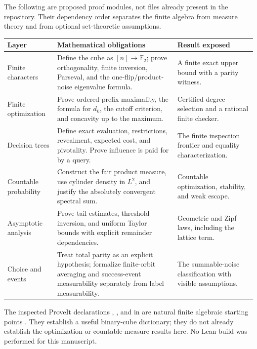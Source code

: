 \documentclass[11pt,a4paper]{article}
\theoremstyle{definition}
\theoremstyle{remark}
\newcommand{\Ftwo}{\mathbb F_2}
\begin{document}
The following are proposed proof modules, not files already present in
the repository. Their dependency order separates the finite algebra from
measure theory and from optional set-theoretic assumptions.

\begin{longtable}{@{}L{.22\textwidth}L{.47\textwidth}L{.22\textwidth}@{}}
\toprule
Layer & Mathematical obligations & Result exposed\\
\midrule
\endhead
Finite characters&
Define the cube as \([n]\to\Ftwo\); prove orthogonality, finite inversion,
Parseval, and the one-flip/product-noise eigenvalue formula.&
A finite exact upper bound with a parity witness.\\
Finite optimization&
Prove ordered-prefix maximality, the formula for \(d_k\), the cutoff
criterion, and concavity up to the maximum.&
Certified degree selection and a rational finite checker.\\
Decision trees&
Define exact evaluation, restrictions, revealment, expected cost,
and pivotality. Prove influence is paid for by a query.&
The finite inspection frontier and equality characterization.\\
Countable probability&
Construct the fair product measure, use cylinder density in \(L^2\),
and justify the absolutely convergent spectral sum.&
Countable optimization, stability, and weak escape.\\
Asymptotic analysis&
Prove tail estimates, threshold inversion, and uniform Taylor bounds
with explicit remainder dependencies.&
Geometric and Zipf laws, including the lattice term.\\
Choice and events&
Treat total parity as an explicit hypothesis; formalize finite-orbit
averaging and success-event measurability separately from label
measurability.&
The summable-noise classification with visible assumptions.\\
\bottomrule
\end{longtable}

The inspected ProveIt declarations
,
, and
in  are natural finite algebraic
starting points \cite{repocube}. They establish a useful binary-cube
dictionary; they do not already establish the optimization or
countable-measure results here. No Lean build was performed for this
manuscript.
\end{document}
